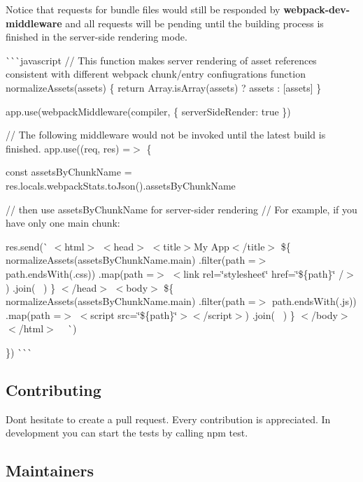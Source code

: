 Notice that requests for bundle files would still be responded by {\bfseries webpack-\/dev-\/middleware} and all requests will be pending until the building process is finished in the server-\/side rendering mode.

\`{}\`{}\`{}javascript // This function makes server rendering of asset references consistent with different webpack chunk/entry confiugrations function normalize\+Assets(assets) \{ return Array.\+is\+Array(assets) ? assets \+: \mbox{[}assets\mbox{]} \}

app.\+use(webpack\+Middleware(compiler, \{ server\+Side\+Render\+: true \})

// The following middleware would not be invoked until the latest build is finished. app.\+use((req, res) =$>$ \{

const assets\+By\+Chunk\+Name = res.\+locals.\+webpack\+Stats.\+to\+Json().assets\+By\+Chunk\+Name

// then use {\ttfamily assets\+By\+Chunk\+Name} for server-\/sider rendering // For example, if you have only one main chunk\+:

res.\+send(\`{} $<$html$>$ $<$head$>$ $<$title$>$My App$<$/title$>$ \$\{ normalize\+Assets(assets\+By\+Chunk\+Name.\+main) .filter(path =$>$ path.\+ends\+With(\textquotesingle{}.css\textquotesingle{})) .map(path =$>$ {\ttfamily $<$link rel=\char`\"{}stylesheet\char`\"{} href=\char`\"{}\$\{path\}\char`\"{} /$>$}) .join(\textquotesingle{}~\newline
\textquotesingle{}) \} $<$/head$>$ $<$body$>$  \$\{ normalize\+Assets(assets\+By\+Chunk\+Name.\+main) .filter(path =$>$ path.\+ends\+With(\textquotesingle{}.js\textquotesingle{})) .map(path =$>$ {\ttfamily $<$script src=\char`\"{}\$\{path\}\char`\"{}$>$$<$/script$>$}) .join(\textquotesingle{}~\newline
\textquotesingle{}) \} $<$/body$>$ $<$/html$>$ ~\newline
 \`{})

\}) \`{}\`{}\`{}

\subsection*{Contributing}

Don\textquotesingle{}t hesitate to create a pull request. Every contribution is appreciated. In development you can start the tests by calling {\ttfamily npm test}.

\subsection*{Maintainers}

